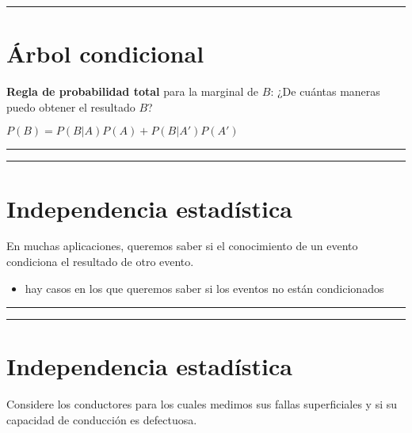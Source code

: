 \documentclass[
]{book}
\providecommand{\tightlist}{%
  \setlength{\itemsep}{0pt}\setlength{\parskip}{0pt}}
\begin{document}
\begin{center}\rule{0.5\linewidth}{0.5pt}\end{center}

\hypertarget{uxe1rbol-condicional-1}{%
\section{Árbol condicional}\label{uxe1rbol-condicional-1}}

\textbf{Regla de probabilidad total} para la marginal de \(B\): ¿De cuántas maneras puedo obtener el resultado \(B\)?

\(P(B)=P(B|A)P(A)+P(B|A')P(A')\)

\begin{center}\rule{0.5\linewidth}{0.5pt}\end{center}

\begin{center}\rule{0.5\linewidth}{0.5pt}\end{center}

\hypertarget{independencia-estaduxedstica}{%
\section{Independencia estadística}\label{independencia-estaduxedstica}}

En muchas aplicaciones, queremos saber si el conocimiento de un evento condiciona el resultado de otro evento.

\begin{itemize}
\tightlist
\item
  hay casos en los que queremos saber si los eventos no están condicionados
\end{itemize}

\begin{center}\rule{0.5\linewidth}{0.5pt}\end{center}

\begin{center}\rule{0.5\linewidth}{0.5pt}\end{center}

\hypertarget{independencia-estaduxedstica-1}{%
\section{Independencia estadística}\label{independencia-estaduxedstica-1}}

Considere los conductores para los cuales medimos sus fallas superficiales y si su capacidad de conducción es defectuosa.
\end{document}
